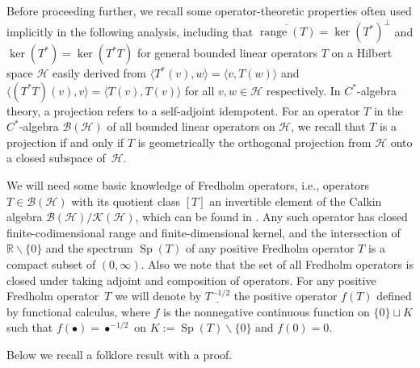 \documentclass[11pt]{article}
\numberwithin{equation}{section}
\begin{document}
Before proceeding further, we recall some operator-theoretic properties often
used implicitly in the following analysis, including that $\overline
{\operatorname{range}(T) }=\ker ( T^{\ast} )
^{\perp}$ and $\ker (T^{\ast} ) =\ker ( T^{\ast}T ) $
for general bounded linear operators $T$ on a Hilbert space $\mathcal{H}$
easily derived from $ \langle T^{\ast}(v) ,w \rangle
= \langle v,T(w) \rangle $ and $ \langle (
T^{\ast}T ) (v) ,v \rangle = \langle T (
v ) ,T(v) \rangle $ for all $v,w\in\mathcal{H}$
respectively. In $C^*$-algebra theory, a projection refers to a self-adjoint
idempotent. For an operator $T$ in the $C^*$-algebra $\mathcal{B} (
\mathcal{H} ) $ of all bounded linear operators on $\mathcal{H}$, we
recall that $T$ is a projection if and only if $T$ is geometrically the
orthogonal projection from $\mathcal{H}$ onto a closed subspace of~$\mathcal{H}$.

We will need some basic knowledge of Fredholm operators, i.e., operators
$T\in\mathcal{B} ( \mathcal{H} ) $ with its quotient class $ [
T ] $ an invertible element of the Calkin algebra $\mathcal{B} (
\mathcal{H} ) /\mathcal{K} ( \mathcal{H} ) $, which can be
found in \cite{Do,Mu}. Any such operator has
closed finite-codimensional range and finite-dimensional kernel, and the
intersection of $\mathbb{R}\backslash \{ 0 \} $ and the spectrum
$\operatorname{Sp}(T) $ of any positive Fredholm operator $T$
is a compact subset of $ ( 0,\infty ) $. Also we note that the set
of all Fredholm operators is closed under taking adjoint and composition of operators.
For any positive Fredholm operator~$T$ we will denote by $\underline{T^{-1/2}}$
the positive
operator $f(T) $ defined by functional calculus, where $f$
is the nonnegative continuous function on $ \{ 0 \} \sqcup K$
such that $f ( \bullet ) =\bullet^{-1/2}$ on $K:=\operatorname{Sp}(T) \backslash \{ 0 \} $ and $f (
0 ) =0$.

Below we recall a folklore result with a proof.
\end{document}
